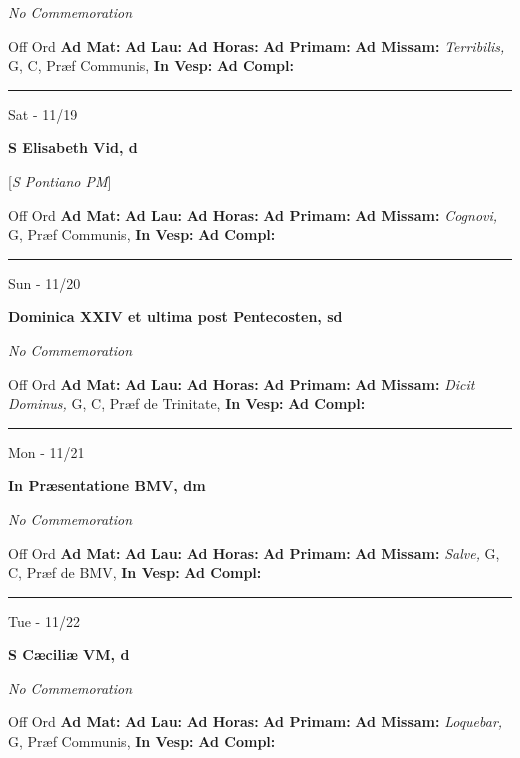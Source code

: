 \documentclass[letterpaper, 10pt]{article}
\begin{document}
\textit{No Commemoration}\begin{justify}
Off Ord
\textbf{Ad Mat: }
\textbf{Ad Lau: }
\textbf{Ad Horas: }
\textbf{Ad Primam: }
\textbf{Ad Missam:} \textit{Terribilis, } G, C, Præf Communis, 
\textbf{In Vesp: }
\textbf{Ad Compl: }\end{justify}



\hrule
\begin{center}
Sat - 11/19
\end{center}\textbf{ \large S Elisabeth Vid, \textnormal{\normalsize d}}

[\textit{S Pontiano PM}]
\begin{justify}
Off Ord
\textbf{Ad Mat: }
\textbf{Ad Lau: }
\textbf{Ad Horas: }
\textbf{Ad Primam: }
\textbf{Ad Missam:} \textit{Cognovi, } G, Præf Communis, 
\textbf{In Vesp: }
\textbf{Ad Compl: }\end{justify}



\hrule
\begin{center}
Sun - 11/20
\end{center}\textbf{ \large Dominica XXIV et ultima post Pentecosten, \textnormal{\normalsize sd}}

\textit{No Commemoration}\begin{justify}
Off Ord
\textbf{Ad Mat: }
\textbf{Ad Lau: }
\textbf{Ad Horas: }
\textbf{Ad Primam: }
\textbf{Ad Missam:} \textit{Dicit Dominus, } G, C, Præf de Trinitate, 
\textbf{In Vesp: }
\textbf{Ad Compl: }\end{justify}



\hrule
\begin{center}
Mon - 11/21
\end{center}\textbf{ \large In Præsentatione BMV, \textnormal{\normalsize dm}}

\textit{No Commemoration}\begin{justify}
Off Ord
\textbf{Ad Mat: }
\textbf{Ad Lau: }
\textbf{Ad Horas: }
\textbf{Ad Primam: }
\textbf{Ad Missam:} \textit{Salve, } G, C, Præf de BMV, 
\textbf{In Vesp: }
\textbf{Ad Compl: }\end{justify}



\hrule
\begin{center}
Tue - 11/22
\end{center}\textbf{ \large S Cæciliæ VM, \textnormal{\normalsize d}}

\textit{No Commemoration}\begin{justify}
Off Ord
\textbf{Ad Mat: }
\textbf{Ad Lau: }
\textbf{Ad Horas: }
\textbf{Ad Primam: }
\textbf{Ad Missam:} \textit{Loquebar, } G, Præf Communis, 
\textbf{In Vesp: }
\textbf{Ad Compl: }\end{justify}
\end{document}
